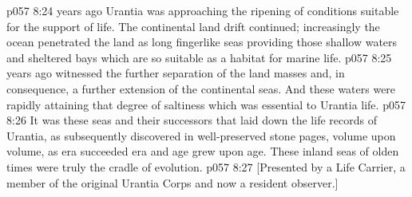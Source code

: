 \vs p057 8:24 \pc {} years ago Urantia was approaching the ripening of conditions suitable for the support of life. The continental land drift continued; increasingly the ocean penetrated the land as long fingerlike seas providing those shallow waters and sheltered bays which are so suitable as a habitat for marine life.
\vs p057 8:25 \pc {} years ago witnessed the further separation of the land masses and, in consequence, a further extension of the continental seas. And these waters were rapidly attaining that degree of saltiness which was essential to Urantia life.
\vs p057 8:26 It was these seas and their successors that laid down the life records of Urantia, as subsequently discovered in well\hyp{}preserved stone pages, volume upon volume, as era succeeded era and age grew upon age. These inland seas of olden times were truly the cradle of evolution.
\vsetoff
\vs p057 8:27 [Presented by a Life Carrier, a member of the original Urantia Corps and now a resident observer.]
